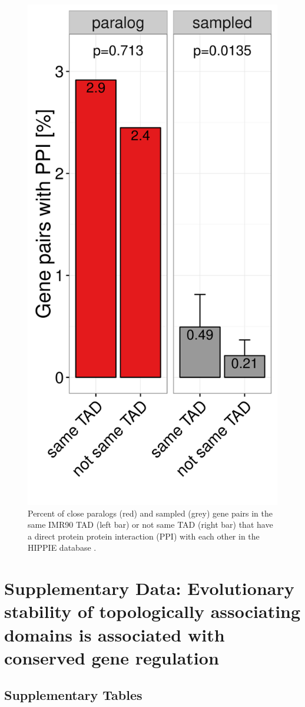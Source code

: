 \documentclass[a4paper,twoside=true,openright,parskip=full,chapterprefix=true,11pt,headings=normal,bibliography=totoc,listof=totoc,titlepage=on,captions=tableabove,draft=false]{scrreprt}
\theoremstyle{definition}
\theoremstyle{definition}
\theoremstyle{definition}
\theoremstyle{remark}
\begin{document}
\begin{figure}

{\centering \includegraphics[width=0.5\linewidth]{figures/paralog/SI/figS14} 

}

\caption{Percent of close paralogs (red) and sampled (grey) gene pairs
in the same IMR90 TAD (left bar) or not same TAD (right bar) that have a
direct protein protein interaction (PPI) with each other in the HIPPIE
database \citep{Schaefer2012}.}\label{fig:PPI}
\end{figure}






\chapter{Supplementary Data: Evolutionary stability of topologically
associating domains is associated with conserved gene
regulation}\label{supplementary-data-evolutionary-stability-of-topologically-associating-domains-is-associated-with-conserved-gene-regulation}

\hypertarget{TadEvoSupTab}{\section{Supplementary
Tables}\label{TadEvoSupTab}}
\end{document}
